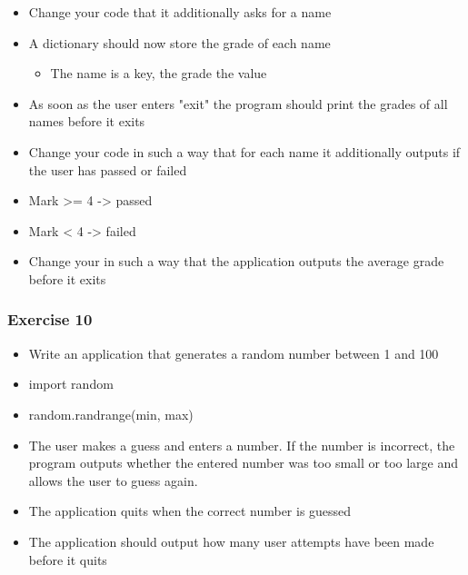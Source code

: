 \documentclass[10pt, a4paper]{beamer} %
\begin{document}
{\begin{frame}
\begin{itemize}
    \item Change your code that it additionally asks for a name
    \item A dictionary should now store the grade of each name
    \begin{itemize}
        \item The name is a key, the grade the value
    \end{itemize}
    \item As soon as the user enters "exit" the program should print the grades of all names before it exits
\end{itemize}

\framebreak

\begin{itemize}
    \item Change your code in such a way that for each name it additionally outputs if the user has passed or failed
    \item Mark >= 4 -> passed
    \item Mark < 4 -> failed
\end{itemize}

\framebreak

\begin{itemize}
    \item Change your in such a way that the application outputs the average grade before it exits
\end{itemize}


\end{frame}

\begin{frame}[c, fragile]\frametitle{Exercise 10}
    
\begin{itemize}
\item  Write an application that generates a random number between 1
and 100
\item  import random
\item  random.randrange(min, max)
\item  The user makes a guess and enters a number. If the number is incorrect, the program outputs whether the entered number was too small or too large and allows the user to guess again.
\item  The application quits when the correct number is guessed
\item  The application should output how many user attempts have been
made before it quits
\end{itemize}


\end{frame}}
\end{document}
